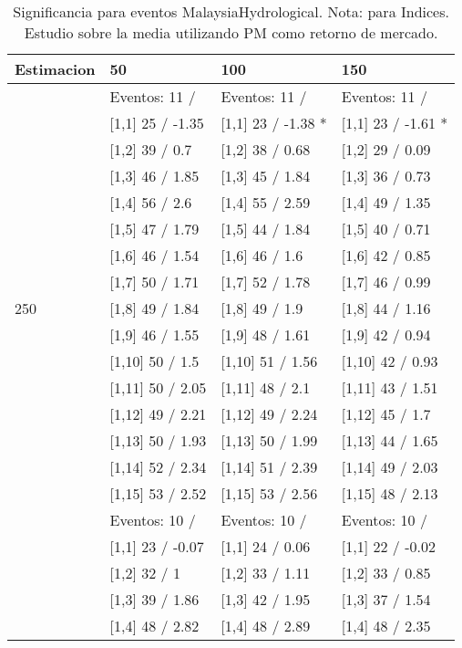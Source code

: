 \begin{table}

\caption{Significancia para eventos MalaysiaHydrological. Nota: para Indices. Estudio sobre la media utilizando PM como retorno de mercado.}
\centering
\begin{tabular}[t]{llll}
\toprule
Estimacion & 50 & 100 & 150\\
\midrule
 & Eventos:  11 / & Eventos:  11 / & Eventos:  11 /\\
 & {}[1,1] 25  / -1.35 & {}[1,1] 23  / -1.38 * & {}[1,1] 23  / -1.61 *\\
 & {}[1,2] 39  / 0.7 & {}[1,2] 38  / 0.68 & {}[1,2] 29  / 0.09\\
 & {}[1,3] 46  / 1.85 & {}[1,3] 45  / 1.84 & {}[1,3] 36  / 0.73\\
 & {}[1,4] 56  / 2.6 & {}[1,4] 55  / 2.59 & {}[1,4] 49  / 1.35\\
\addlinespace
 & {}[1,5] 47  / 1.79 & {}[1,5] 44  / 1.84 & {}[1,5] 40  / 0.71\\
 & {}[1,6] 46  / 1.54 & {}[1,6] 46  / 1.6 & {}[1,6] 42  / 0.85\\
 & {}[1,7] 50  / 1.71 & {}[1,7] 52  / 1.78 & {}[1,7] 46  / 0.99\\
250 & {}[1,8] 49  / 1.84 & {}[1,8] 49  / 1.9 & {}[1,8] 44  / 1.16\\
 & {}[1,9] 46  / 1.55 & {}[1,9] 48  / 1.61 & {}[1,9] 42  / 0.94\\
\addlinespace
 & {}[1,10] 50  / 1.5 & {}[1,10] 51  / 1.56 & {}[1,10] 42  / 0.93\\
 & {}[1,11] 50  / 2.05 & {}[1,11] 48  / 2.1 & {}[1,11] 43  / 1.51\\
 & {}[1,12] 49  / 2.21 & {}[1,12] 49  / 2.24 & {}[1,12] 45  / 1.7\\
 & {}[1,13] 50  / 1.93 & {}[1,13] 50  / 1.99 & {}[1,13] 44  / 1.65\\
 & {}[1,14] 52  / 2.34 & {}[1,14] 51  / 2.39 & {}[1,14] 49  / 2.03\\
\addlinespace
 & {}[1,15] 53  / 2.52 & {}[1,15] 53  / 2.56 & {}[1,15] 48  / 2.13\\
 & Eventos:  10 / & Eventos:  10 / & Eventos:  10 /\\
 & {}[1,1] 23  / -0.07 & {}[1,1] 24  / 0.06 & {}[1,1] 22  / -0.02\\
 & {}[1,2] 32  / 1 & {}[1,2] 33  / 1.11 & {}[1,2] 33  / 0.85\\
 & {}[1,3] 39  / 1.86 & {}[1,3] 42  / 1.95 & {}[1,3] 37  / 1.54\\
\addlinespace
 & {}[1,4] 48  / 2.82 & {}[1,4] 48  / 2.89 & {}[1,4] 48  / 2.35\\

\end{tabular}
\end{table}

